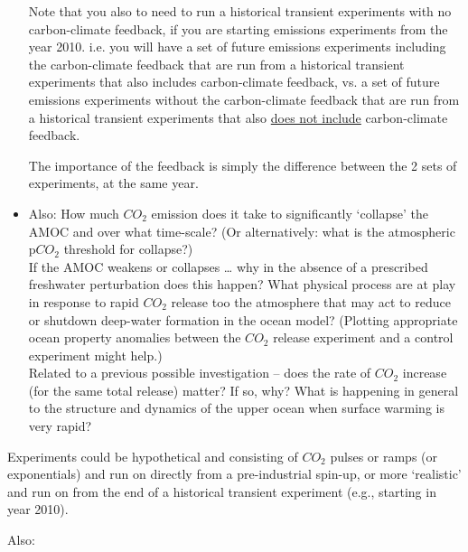 \documentclass[11pt,fleqn]{book} %
\begin{document}
\begin{itemize}[noitemsep]
Note that you also to need to run a historical transient experiments with no carbon-climate feedback, if you are starting emissions experiments from the year 2010. i.e. you will have a set of future emissions experiments including the carbon-climate feedback that are run from a historical transient experiments that also includes carbon-climate feedback, vs. a set of future emissions experiments without the carbon-climate feedback that are run from a historical transient experiments that also \uline{does not include} carbon-climate feedback.

The importance of the feedback is simply the difference between the 2 sets of experiments, at the same year.

\vspace{1mm}
\item Also: How much \(CO_{2}\) emission does it take to significantly ‘collapse’ the AMOC and over what time-scale? (Or alternatively: what is the atmospheric p\(CO_{2}\) threshold for collapse?)
\\ If the AMOC weakens or collapses … why in the absence of a prescribed freshwater perturbation does this happen? What physical process are at play in response to rapid \(CO_{2}\) release too the atmosphere that may act to reduce or shutdown deep-water formation in the ocean model? (Plotting appropriate ocean property anomalies between the \(CO_{2}\) release experiment and a control experiment might help.)
\\Related to a previous possible investigation -- does the rate of \(CO_{2}\) increase (for the same total release) matter? If so, why? What is happening in general to the structure and dynamics of the upper ocean when surface warming is very rapid?

\end{itemize}

\vspace{1mm}
\noindent Experiments could be hypothetical and consisting of \(CO_{2}\) pulses or ramps (or exponentials) and run on directly from a pre-industrial spin-up, or more ‘realistic’ and run on from the end of a historical transient experiment (e.g., starting in year 2010).

\noindent Also:
\end{document}

